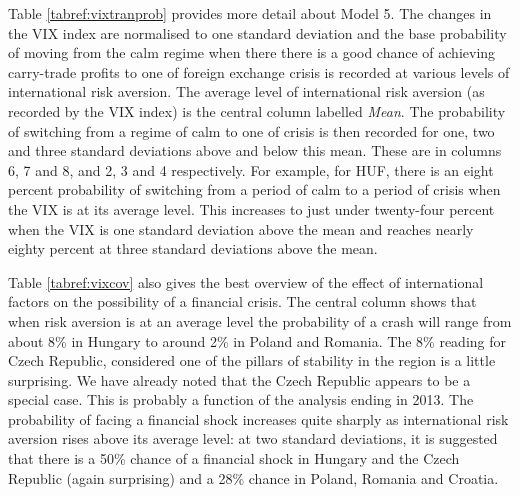 \documentclass[12pt, a4paper, oneside]{article}\usepackage[]{graphicx}\usepackage[]{color}
\begin{document}
Table \ref{tabref:vixtranprob} provides more detail about Model 5.  The changes in the VIX index are normalised to one standard deviation and the base probability of moving from the calm regime when there there is a good chance of achieving carry-trade profits to one of foreign exchange crisis is recorded at various levels of international risk aversion.  The average level of international risk aversion (as recorded by the VIX index) is the central column labelled \emph{Mean}.  The probability of switching from a regime of calm to one of crisis is then recorded for one, two and three standard deviations above and below this mean.  These are in columns 6, 7 and 8, and 2, 3 and 4 respectively.  For example, for HUF, there is an eight percent  probability of switching from a period of calm to a period of crisis when the VIX is at its average level. This increases to just under twenty-four percent when the VIX is one standard deviation above the mean and reaches nearly eighty percent at three standard deviations above the mean. 

Table \ref{tabref:vixcov} also gives the best overview of the effect of international factors on the possibility of a financial crisis.  The central column shows that when risk aversion is at an average level the probability of a crash will range from about 8\% in Hungary to around 2\% in Poland and Romania.  The 8\% reading for Czech Republic, considered one of the pillars of stability in the region is a little surprising. We have already noted that the Czech Republic appears to be a special case. This is probably a function of the analysis ending in 2013.  The probability of facing a financial shock increases quite sharply as international risk aversion rises above its average level: at two standard deviations, it is suggested that there is a 50\% chance of a financial shock in Hungary and the Czech Republic (again surprising) and a 28\% chance in Poland, Romania and Croatia. 
\end{document}
